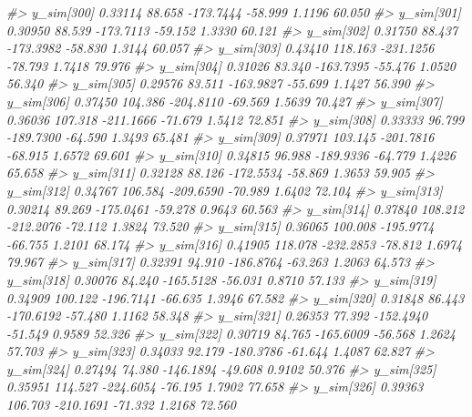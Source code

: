 \documentclass[
  10pt,
  italian,
  a4paper,
  extrafontsizes,onecolumn,openright
  ]{memoir}
\newenvironment{Shaded}{\begin{snugshade}}{\end{snugshade}}
\newcommand{\CommentTok}[1]{\textcolor[rgb]{0.56,0.35,0.01}{\textit{#1}}}
\begin{document}
\begin{Shaded}
\begin{Highlighting}[]
\CommentTok{\#\textgreater{}   y\_sim[300]  0.33114  88.658 {-}173.7444 {-}58.999  1.1196 60.050}
\CommentTok{\#\textgreater{}   y\_sim[301]  0.30950  88.539 {-}173.7113 {-}59.152  1.3330 60.121}
\CommentTok{\#\textgreater{}   y\_sim[302]  0.31750  88.437 {-}173.3982 {-}58.830  1.3144 60.057}
\CommentTok{\#\textgreater{}   y\_sim[303]  0.43410 118.163 {-}231.1256 {-}78.793  1.7418 79.976}
\CommentTok{\#\textgreater{}   y\_sim[304]  0.31026  83.340 {-}163.7395 {-}55.476  1.0520 56.340}
\CommentTok{\#\textgreater{}   y\_sim[305]  0.29576  83.511 {-}163.9827 {-}55.699  1.1427 56.390}
\CommentTok{\#\textgreater{}   y\_sim[306]  0.37450 104.386 {-}204.8110 {-}69.569  1.5639 70.427}
\CommentTok{\#\textgreater{}   y\_sim[307]  0.36036 107.318 {-}211.1666 {-}71.679  1.5412 72.851}
\CommentTok{\#\textgreater{}   y\_sim[308]  0.33333  96.799 {-}189.7300 {-}64.590  1.3493 65.481}
\CommentTok{\#\textgreater{}   y\_sim[309]  0.37971 103.145 {-}201.7816 {-}68.915  1.6572 69.601}
\CommentTok{\#\textgreater{}   y\_sim[310]  0.34815  96.988 {-}189.9336 {-}64.779  1.4226 65.658}
\CommentTok{\#\textgreater{}   y\_sim[311]  0.32128  88.126 {-}172.5534 {-}58.869  1.3653 59.905}
\CommentTok{\#\textgreater{}   y\_sim[312]  0.34767 106.584 {-}209.6590 {-}70.989  1.6402 72.104}
\CommentTok{\#\textgreater{}   y\_sim[313]  0.30214  89.269 {-}175.0461 {-}59.278  0.9643 60.563}
\CommentTok{\#\textgreater{}   y\_sim[314]  0.37840 108.212 {-}212.2076 {-}72.112  1.3824 73.520}
\CommentTok{\#\textgreater{}   y\_sim[315]  0.36065 100.008 {-}195.9774 {-}66.755  1.2101 68.174}
\CommentTok{\#\textgreater{}   y\_sim[316]  0.41905 118.078 {-}232.2853 {-}78.812  1.6974 79.967}
\CommentTok{\#\textgreater{}   y\_sim[317]  0.32391  94.910 {-}186.8764 {-}63.263  1.2063 64.573}
\CommentTok{\#\textgreater{}   y\_sim[318]  0.30076  84.240 {-}165.5128 {-}56.031  0.8710 57.133}
\CommentTok{\#\textgreater{}   y\_sim[319]  0.34909 100.122 {-}196.7141 {-}66.635  1.3946 67.582}
\CommentTok{\#\textgreater{}   y\_sim[320]  0.31848  86.443 {-}170.6192 {-}57.480  1.1162 58.348}
\CommentTok{\#\textgreater{}   y\_sim[321]  0.26353  77.392 {-}152.4940 {-}51.549  0.9589 52.326}
\CommentTok{\#\textgreater{}   y\_sim[322]  0.30719  84.765 {-}165.6009 {-}56.568  1.2624 57.703}
\CommentTok{\#\textgreater{}   y\_sim[323]  0.34033  92.179 {-}180.3786 {-}61.644  1.4087 62.827}
\CommentTok{\#\textgreater{}   y\_sim[324]  0.27494  74.380 {-}146.1894 {-}49.608  0.9102 50.376}
\CommentTok{\#\textgreater{}   y\_sim[325]  0.35951 114.527 {-}224.6054 {-}76.195  1.7902 77.658}
\CommentTok{\#\textgreater{}   y\_sim[326]  0.39363 106.703 {-}210.1691 {-}71.332  1.2168 72.560}

\end{Highlighting}
\end{Shaded}
\end{document}
